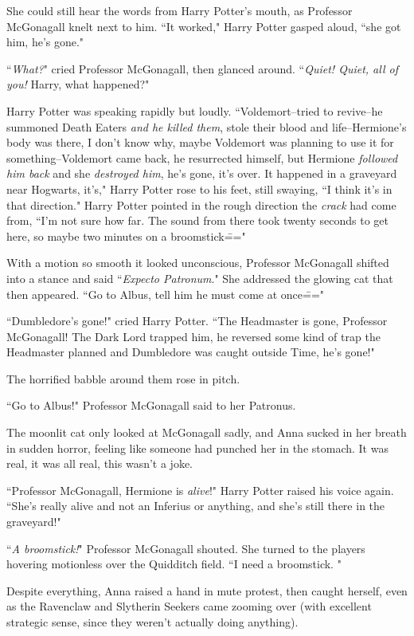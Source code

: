 She could still hear the words from Harry Potter's mouth, as Professor McGonagall knelt next to him. ``It worked," Harry Potter gasped aloud, ``she got him, he's gone."

``\emph{What?}" cried Professor McGonagall, then glanced around. ``\emph{Quiet! Quiet, all of you!} Harry, what happened?"

Harry Potter was speaking rapidly but loudly. ``Voldemort\---tried to revive\---he summoned Death Eaters \emph{and he killed them}, stole their blood and life\---Hermione's body was there, I don't know why, maybe Voldemort was planning to use it for something\---Voldemort came back, he resurrected himself, but Hermione \emph{followed him back} and she \emph{destroyed him}, he's gone, it's over. It happened in a graveyard near Hogwarts, it's," Harry Potter rose to his feet, still swaying, ``I think it's in that direction." Harry Potter pointed in the rough direction the \emph{crack} had come from, ``I'm not sure how far. The sound from there took twenty seconds to get here, so maybe two minutes on a broomstick\==="

With a motion so smooth it looked unconscious, Professor McGonagall shifted into a stance and said ``\emph{Expecto Patronum}." She addressed the glowing cat that then appeared. ``Go to Albus, tell him he must come at once\==="

``Dumbledore's gone!" cried Harry Potter. ``The Headmaster is gone, Professor McGonagall! The Dark Lord trapped him, he reversed some kind of trap the Headmaster planned and Dumbledore was caught outside Time, he's gone!"

The horrified babble around them rose in pitch.

``Go to Albus!" Professor McGonagall said to her Patronus.

The moonlit cat only looked at McGonagall sadly, and Anna sucked in her breath in sudden horror, feeling like someone had punched her in the stomach. It was real, it was all real, this wasn't a joke.

``Professor McGonagall, Hermione is \emph{alive}!" Harry Potter raised his voice again. ``She's really alive and not an Inferius or anything, and she's still there in the graveyard!"

``\emph{A broomstick!}" Professor McGonagall shouted. She turned to the players hovering motionless over the Quidditch field. ``I need a broomstick. "

Despite everything, Anna raised a hand in mute protest, then caught herself, even as the Ravenclaw and Slytherin Seekers came zooming over (with excellent strategic sense, since they weren't actually doing anything).

